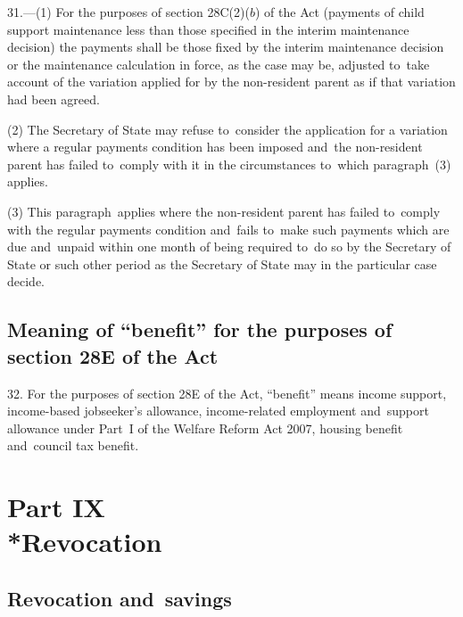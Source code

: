 \documentclass[12pt,a4paper]{article}
\begin{document}
\renewcommand\parthead{--- Part VIII}

31.---(1)  For the purposes of section 28C(2)($b$)  of the Act (payments of child support maintenance less than those specified in the interim maintenance decision) the payments shall be those fixed by the interim maintenance decision or the maintenance calculation in force, as the case may be, adjusted to~take account of the variation applied for by the non-resident parent as if that variation had been agreed.

(2) The Secretary of State may refuse to~consider the application for a variation where a regular payments condition has been imposed and~the non-resident parent has failed to~comply with it in the circumstances to~which paragraph~(3) applies.

(3) This paragraph~applies where the non-resident parent has failed to~comply with the regular payments condition and~fails to~make such payments which are due and~unpaid within one month of being required to~do so by the Secretary of State or such other period as the Secretary of State may in the particular case decide.

\subsection[32. Meaning of “benefit” for the purposes of section 28E of the Act]{Meaning of “benefit” for the purposes of section 28E of the Act}

32.  For the purposes of section 28E of the Act, “benefit” means income support, income-based jobseeker’s allowance, 
income-related employment and~support allowance under Part~I of the Welfare Reform Act 2007,  %
housing benefit and~council tax benefit.


\section[Part IX --- Revocation]{Part IX\\*Revocation}

\renewcommand\parthead{--- Part IX}

\subsection[33. Revocation and~savings]{Revocation and~savings}
\end{document}
